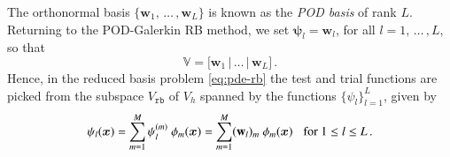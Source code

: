 \documentclass{elsarticle}
\theoremstyle{theorem}
\theoremstyle{definition}
\theoremstyle{remark}
\theoremstyle{proposition}
\numberwithin{figure}{section}
\newcommand{\bg}[1]{\boldsymbol{#1}}
\begin{document}
		\noindent The orthonormal basis $\big\lbrace \mathbf{w}_1, \, \ldots \, , \mathbf{w}_L \big\rbrace$ is known as the \emph{POD basis} of rank $L$. Returning to the POD-Galerkin RB method, we set $\bg{\psi}_l = \mathbf{w}_l$, for all $l = 1, \, \ldots \, , L$, so that
		\begin{equation*}
			\mathbb{V} = \big[ \mathbf{w}_1 \, \big| \, \ldots \, \big| \, \mathbf{w}_L \big] \, . %
		\end{equation*}
		Hence, in the reduced basis problem \eqref{eq:pde-rb} the test and trial functions are picked from the subspace $V_{\texttt{rb}}$ of $V_h$ spanned by the functions $\big\lbrace \psi_l \big\rbrace_{l = 1}^L$, given by
		\begin{equation}
			\label{eq:pod-fe-basis-functions}
			\psi_l(\bg{x}) = \sum_{m = 1}^M \psi_l^{(m)} ~ \phi_m(\bg{x}) = \sum_{m = 1}^M (\mathbf{w}_l)_m ~ \phi_m(\bg{x}) \hspace*{0.3cm} \text{for $1 \leq l \leq L$} \, .
		\end{equation}
		
	\iffalse
		Let us point out that, in case of a scalar underlying differential equation, the POD basis functions $\big\lbrace \psi_l \big\rbrace_{l = 1}^L$ are orthonormal on $V_h = X_h^r$ with respect to the following discrete scalar product $(\cdot,\cdot)_h$:
		\begin{equation}
			\label{eq:discrete-scalar-product}
			(\chi_h, \, \xi_h)_h = \sum_{i = 1}^M \chi_h(\bg{N}_i) ~ \xi_h(\bg{N}_i) = \sum_{i = 1}^M \chi_h^{(i)} ~ \xi_h^{(i)} = (\bg{\chi}_h, \, \bg{\xi}_h)_{\mathbb{R}^M} \, .
		\end{equation}
	\fi
	
\end{document}
